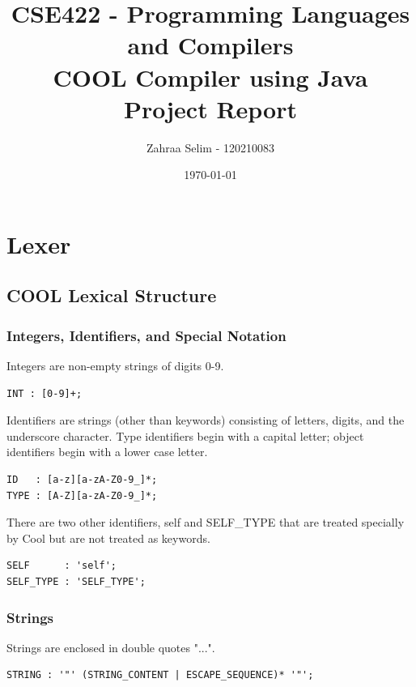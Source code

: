 \documentclass[titlepage]{article}
\title{
    CSE422 - Programming Languages and Compilers \\
    COOL Compiler using Java \\
    Project Report
}
\author{
    Zahraa Selim - 120210083
}
\date{\today}
\begin{document}
\maketitle
\tableofcontents
\newpage

\section{Lexer}

\subsection{COOL Lexical Structure}

\subsubsection{Integers, Identifiers, and Special Notation}

Integers are non-empty strings of digits 0-9. 

\begin{lstlisting}[basicstyle=\ttfamily]
INT : [0-9]+;
\end{lstlisting}

Identifiers are strings (other than keywords) consisting of letters, digits, and the underscore character. Type identifiers begin with a capital letter; object identifiers begin with a lower case letter.

\begin{lstlisting}[basicstyle=\ttfamily]
ID   : [a-z][a-zA-Z0-9_]*;
TYPE : [A-Z][a-zA-Z0-9_]*;
\end{lstlisting}

There are two other identifiers, self and SELF\_TYPE that are treated specially by Cool but are not treated as keywords. 

\begin{lstlisting}[basicstyle=\ttfamily]
SELF      : 'self';
SELF_TYPE : 'SELF_TYPE';
\end{lstlisting}

\subsubsection{Strings}

Strings are enclosed in double quotes "...". 

\begin{lstlisting}[basicstyle=\ttfamily]
STRING : '"' (STRING_CONTENT | ESCAPE_SEQUENCE)* '"';
\end{lstlisting}
\end{document}
